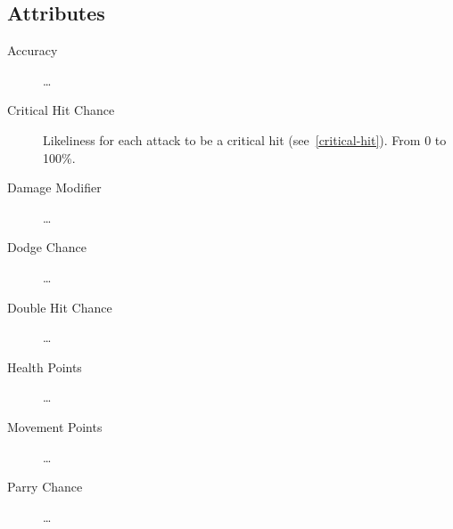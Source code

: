 \subsection{Attributes}
\label{character-attributes}
\begin{description}
\item[Accuracy] \ldots
\item[Critical Hit Chance]
   Likeliness for each attack to be a critical hit (see~\ref{critical-hit}).
   From 0 to 100\%.
\item[Damage Modifier] \ldots
\item[Dodge Chance] \ldots
\item[Double Hit Chance] \ldots
\item[Health Points] \ldots
\item[Movement Points] \ldots
\item[Parry Chance] \ldots
\end{description}
